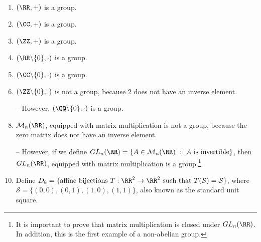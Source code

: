 \begin{exmp}~
	\begin{enumerate}
		\item $(\RR, +)$ is a group.
		\item $(\CC, +)$ is a group.
		\item $(\ZZ, +)$ is a group.
		\item $(\RR\backslash\{0\}, \cdot)$ is a group.
		\item $(\CC\backslash\{0\}, \cdot)$ is a group.
		\item $(\ZZ\backslash\{0\}, \cdot)$ is not a group, because $2$ does not have an inverse element.
		\item[--] However, $(\QQ\backslash\{0\}, \cdot)$ is a group.
		\item $\mathcal{M}_n(\RR)$, equipped with matrix multiplication is not a group, because the zero matrix does not have an inverse element.
		\item[--] However, if we define $GL_n(\RR) = \{A \in \mathcal{M}_n(\RR)\ :\ \text{$A$ is invertible}\}$, then $GL_n(\RR)$, equipped with matrix multiplication is a group.\footnote{It is important to prove that matrix multiplication is closed under $GL_n(\RR)$. In addition, this is the first example of a non-abelian group.}
		
		\item Define $D_8 = \{\text{affine bijections}\ T:\RR^2 \to \RR^2\ \text{such that}\ T(\mathcal{S}) = \mathcal{S}\}$, where $\mathcal{S} = \{(0,0), (0,1), (1, 0), (1, 1)\}$, also known as the standard unit square.
			
	\end{enumerate}
\end{exmp}

